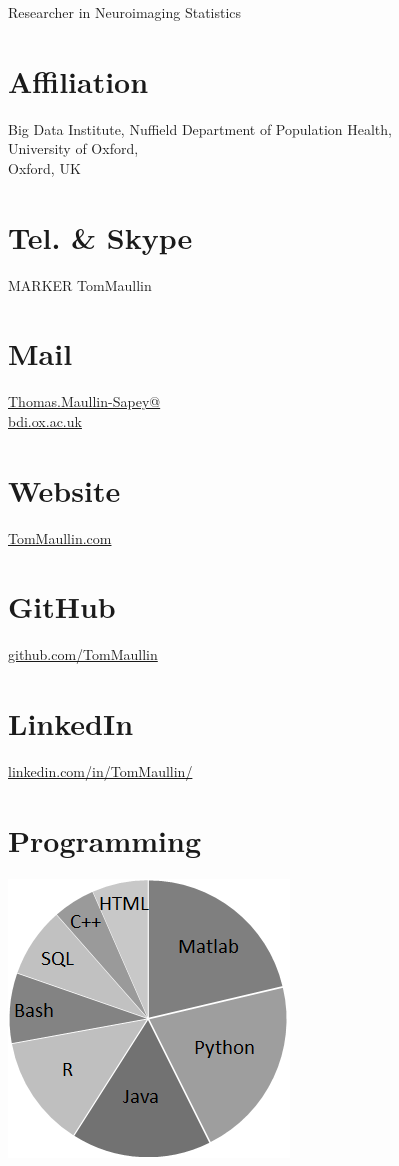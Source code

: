 \documentclass{friggeri-cv}
\begin{document}
      {\hspace{5cm} Researcher in Neuroimaging Statistics}
      

\begin{aside}
  \section{\normalsize{Affiliation}}
	\footnotesize{Big Data Institute,
Nuffield Department of Population Health,\\ University of Oxford,\\ Oxford, UK} 
    ~
  \section{\normalsize{Tel. \& Skype}}
    MARKER
    TomMaullin
    ~
  \section{\normalsize{Mail}}
    \href{mailto:Thomas.Maullin-Sapey@bdi.ox.ac.uk}{Thomas.Maullin-Sapey@\\bdi.ox.ac.uk}
    ~
  \section{\normalsize{Website}}
    \href{https://TomMaullin.com}{TomMaullin.com}
    ~
  \section{\normalsize{GitHub}}
    \href{https://github.com/TomMaullin}{github.com/TomMaullin}
    ~
  \section{\normalsize{LinkedIn}}
    \href{https://linkedin.com/in/tommaullin/}{linkedin.com/in/TomMaullin/}
    ~
  \section{\normalsize{Programming}}
    \vspace{2mm}\includegraphics[scale=0.42]{img/piechart.png}
    ~
\end{aside}
\vspace{0.5cm}
\end{document}
